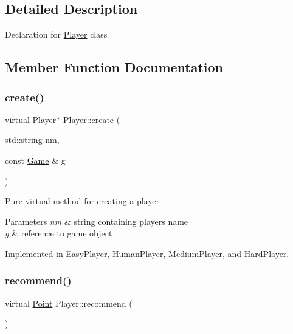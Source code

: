 \subsection{Detailed Description}
Declaration for \mbox{\hyperlink{class_player}{Player}} class 

\subsection{Member Function Documentation}
\mbox{\label{class_player_a9b9133f3347894da1416953048cecdb2}} 
\subsubsection{\texorpdfstring{create()}{create()}}
{\footnotesize\ttfamily virtual \mbox{\hyperlink{class_player}{Player}}$\ast$ Player\+::create (\begin{DoxyParamCaption}\item[{std\+::string}]{nm,  }\item[{const \mbox{\hyperlink{class_game}{Game}} \&}]{g }\end{DoxyParamCaption})\hspace{0.3cm}{\ttfamily [pure virtual]}}

Pure virtual method for creating a player 
\begin{DoxyParams}{Parameters}
{\em nm} & string containing player\textquotesingle{}s name \\
\hline
{\em g} & reference to game object \\
\hline
\end{DoxyParams}


Implemented in \mbox{\hyperlink{class_easy_player_a5c9837adc8dd76f5bb9e3ee7a576658f}{Easy\+Player}}, \mbox{\hyperlink{class_human_player_acc99520ffa6b0a1885d081fde6f2297b}{Human\+Player}}, \mbox{\hyperlink{class_medium_player_a7a681c6bebf67740d1919339bd423ac5}{Medium\+Player}}, and \mbox{\hyperlink{class_hard_player_aa435bcb65ee8b3aea7553196c95fc4e1}{Hard\+Player}}.

\mbox{\label{class_player_a2cc7a83d11158eafd8d49d4b9f23ce56}} 
\subsubsection{\texorpdfstring{recommend()}{recommend()}}
{\footnotesize\ttfamily virtual \mbox{\hyperlink{class_point}{Point}} Player\+::recommend (\begin{DoxyParamCaption}{ }\end{DoxyParamCaption})\hspace{0.3cm}{\ttfamily [pure virtual]}}

